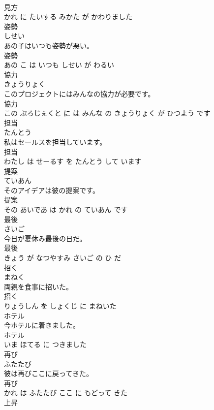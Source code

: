 \documentclass[8pt]{extreport}
\begin{document}
\begin{CJK}{UTF8}{min}
\\	見方 
\\	かれ に たいする みかた が かわりました			
\\	姿勢	
\\	しせい			
\\	あの子はいつも姿勢が悪い。	
\\	姿勢 
\\	あの こ は いつも しせい が わるい			
\\	協力	
\\	きょうりょく			
\\	このプロジェクトにはみんなの協力が必要です。	
\\	協力 
\\	この ぷろじぇくと に は みんな の きょうりょく が ひつよう です			
\\	担当	
\\	たんとう			
\\	私はセールスを担当しています。	
\\	担当 
\\	わたし は せーるす を たんとう して います			
\\	提案	
\\	ていあん			
\\	そのアイデアは彼の提案です。	
\\	提案 
\\	その あいであ は かれ の ていあん です			
\\	最後	
\\	さいご			
\\	今日が夏休み最後の日だ。	
\\	最後 
\\	きょう が なつやすみ さいご の ひ だ			
\\	招く	
\\	まねく			
\\	両親を食事に招いた。	
\\	招く 
\\	りょうしん を しょくじ に まねいた			
\\	ホテル	
\\	今ホテルに着きました。	
\\	ホテル 
\\	いま ほてる に つきました			
\\	再び	
\\	ふたたび			
\\	彼は再びここに戻ってきた。	
\\	再び 
\\	かれ は ふたたび ここ に もどって きた			
\\	上昇	

\end{CJK}
\end{document}
